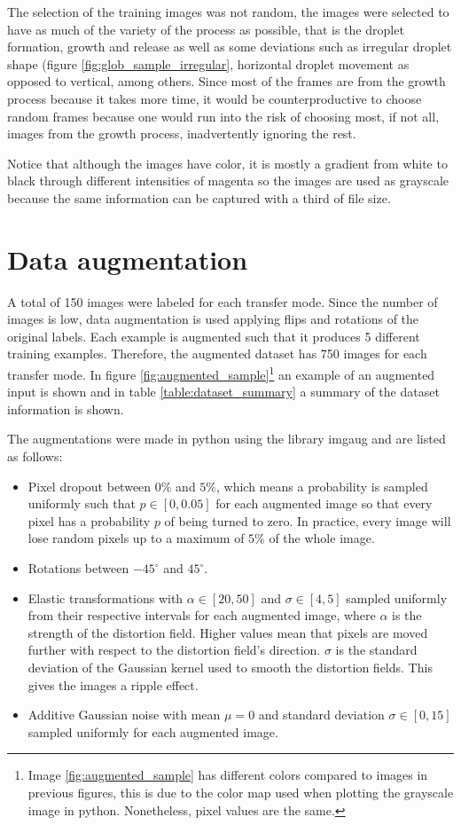 The selection of the training images was not random, the images were selected to have as much of the variety of the process as possible, that is the droplet formation, growth and release as well as some deviations such as irregular droplet shape (figure \ref{fig:glob_sample_irregular}, horizontal droplet movement as opposed to vertical, among others. Since most of the frames are from the growth process because it takes more time, it would be counterproductive to choose random frames because one would run into the risk of choosing most, if not all, images from the growth process, inadvertently ignoring the rest.

Notice that although the images have color, it is mostly a gradient from white to black through different intensities of magenta so the images are used as grayscale because the same information can be captured with a third of file size.

\section{Data augmentation}
A total of 150 images were labeled for each transfer mode. Since the number of images is low, data augmentation is used applying flips and rotations of the original labels. Each example is augmented such that it produces 5 different training examples. Therefore, the augmented dataset has 750 images for each transfer mode. In figure \ref{fig:augmented_sample}\footnote{Image \ref{fig:augmented_sample} has different colors compared to images in previous figures, this is due to the color map used when plotting the grayscale image in python. Nonetheless, pixel values are the same.} an example of an augmented input is shown and in table \ref{table:dataset_summary} a summary of the dataset information is shown.

The augmentations were made in python using the library imgaug and are listed as follows: 
\begin{itemize}
    \item Pixel dropout between $0\%$ and $5\%$, which means a probability is sampled uniformly such that $p \in [0, 0.05]$ for each augmented image so that every pixel has a probability $p$ of being turned to zero. In practice, every image will lose random pixels up to a maximum of $5\%$ of the whole image.
    \item Rotations between $-45^\circ$ and $45^\circ$.
    \item Elastic transformations with $\alpha \in [20, 50]$ and $\sigma\in [4,5]$ sampled uniformly from their respective intervals for each augmented image, where $\alpha$ is the strength of the distortion field. Higher values mean that pixels are moved further with respect to the distortion field's direction. $\sigma$ is the standard deviation of the Gaussian kernel used to smooth the distortion  
    fields. This gives the images a ripple effect.
    \item Additive Gaussian noise with mean $\mu=0$ and standard deviation $\sigma\in[0,15]$ sampled uniformly for each augmented image.
\end{itemize}

